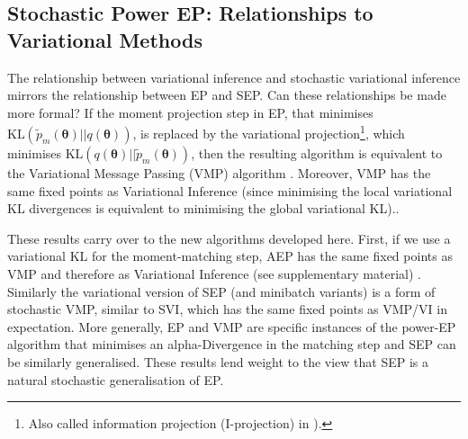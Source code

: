 %

\subsection{Stochastic Power EP: Relationships to Variational Methods}
%
The relationship between variational inference and stochastic variational inference \cite{hoffman:svi} mirrors the relationship between EP and SEP. Can these relationships be made more formal? If the moment projection step in EP, that minimises $\mathrm{KL}(\tilde{p}_m(\bm{\theta}) ||q(\bm{\theta}))$, is replaced by the variational projection\footnote{Also called information projection (I-projection) in \cite{amari:ig}).}, which minimises $\mathrm{KL}(q(\bm{\theta})||\tilde{p}_m(\bm{\theta}) )$,  then the resulting algorithm is equivalent to the Variational Message Passing (VMP) algorithm \cite{minka:divergence}. Moreover, VMP has the same fixed points as Variational Inference \cite{winn:vmp} (since minimising the local variational KL divergences is equivalent to minimising the global variational KL).. 

These results carry over to the new algorithms developed here. First, if we use a variational KL for the moment-matching step, AEP has the same fixed points as VMP and therefore as Variational Inference (see supplementary material) . Similarly the variational version of SEP (and minibatch variants) is a form of stochastic VMP, similar to SVI, which has the same fixed points as VMP/VI in expectation. More generally, EP and VMP are specific instances of the power-EP algorithm that minimises an alpha-Divergence in the matching step and SEP can be similarly generalised. These results lend weight to the view that SEP is a natural stochastic generalisation of EP.


